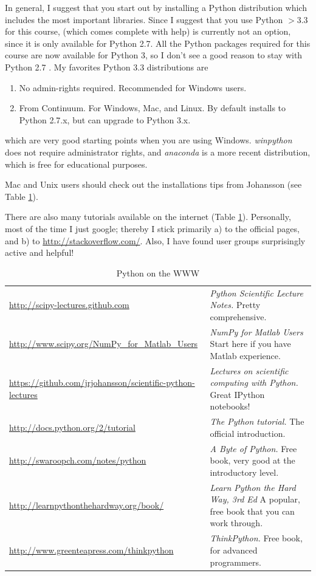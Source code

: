 In general, I suggest that you start out by installing a Python distribution which includes the most important libraries. Since I suggest that you use Python $>3.3$ for this course, \cite{pythonxy} (which comes complete with help) is currently not an option, since it is only available for Python 2.7. All the Python packages required for this course are now available for Python 3, so I don't see a good reason to stay with Python 2.7 . My favorites Python 3.3 distributions  are

\begin{enumerate}
    \item \cite{winpython} No admin-rights required. Recommended for Windows users.
    \item \cite{anaconda} From Continuum. For Windows, Mac, and Linux. By default installs to Python 2.7.x, but can upgrade to Python 3.x.
\end{enumerate}

which are very good starting points when you are using Windows. \emph{winpython} does not require administrator rights, and \emph{anaconda} is a more recent distribution, which is free for educational purposes.

Mac and Unix users should check out the installations tips from Johansson (see Table \ref{table:python}).

There are also many tutorials available on the internet (Table \ref{table:python}). Personally, most of the time I just google; thereby I stick primarily a) to the official pages, and b) to \url{http://stackoverflow.com/}. Also, I have found user groups surprisingly active and helpful!

\begin{table}

  \footnotesize{
  \centering
   \begin{tabular}{|p{8 cm}|p{8 cm}|}
     \hline
     \url{http://scipy-lectures.github.com} & \emph{Python Scientific Lecture Notes.} Pretty comprehensive. \\     \url{http://www.scipy.org/NumPy\_for\_Matlab\_Users} & \emph{NumPy for Matlab Users} Start here if you have Matlab experience. \\
     \url {https://github.com/jrjohansson/scientific-python-lectures} & \emph{Lectures on scientific computing with Python.} Great IPython notebooks! \\     \url{http://docs.python.org/2/tutorial} & \emph{The Python tutorial.} The official introduction. \\
     \url{http://swaroopch.com/notes/python} & \emph{A Byte of Python.} Free book, very good at the introductory level. \\
     \url{http://learnpythonthehardway.org/book/} & \emph{Learn Python the Hard Way, 3rd Ed} A popular, free book that you can work through. \\
     \url{http://www.greenteapress.com/thinkpython} & \emph{ThinkPython.} Free book, for advanced programmers. \\

     \hline
   \end{tabular}
   }
  \caption{Python on the WWW}\label{table:python}
\end{table}

